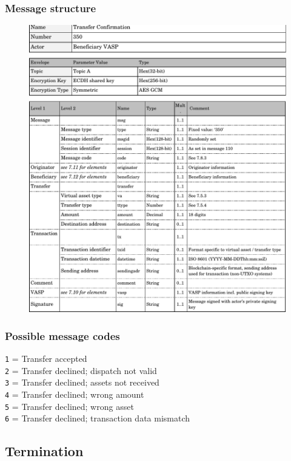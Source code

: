 \documentclass{article}
\begin{document}
\subsubsection{Message structure}
\begin{figure}[h]
    \centering
    \includegraphics[width=\textwidth]{g25.pdf}
\end{figure}
\subsubsection{Possible message codes}
\verb+1+ = Transfer accepted\\
\verb+2+ = Transfer declined; dispatch not valid\\
\verb+3+ = Transfer declined; assets not received\\
\verb+4+ = Transfer declined; wrong amount\\
\verb+5+ = Transfer declined; wrong asset\\
\verb+6+ = Transfer declined; transaction data mismatch\\
\newpage

\subsection{Termination}
\end{document}
